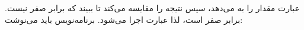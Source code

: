 \section{}
\paragraph{}\label{answer:47}
عبارت  مقدار  را به  می‌دهد، سپس نتیجه را مقایسه می‌کند تا ببیند که برابر صفر نیست. برابر صفر است، لذا عبارت  اجرا می‌شود. برنامه‌نویس باید می‌نوشت:
\LTR\noindent
{}
\RTL